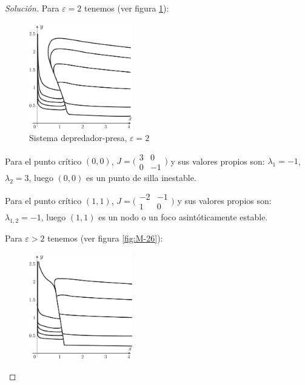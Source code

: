 \documentclass[a5paper,doc,10pt,noapacite]{apa6}
\begin{document}
{{\begin{proof}[Solución]
	\newpage
	Para \(\varepsilon=2\) tenemos (ver figura \ref{fig:M-25}):
	
	\begin{figure}[H]
		\captionsetup{justification=centering, labelfont=footnotesize, font=footnotesize}
		\centering
		\includegraphics[width=4.5cm]{Graficos/figura25}
	
		\caption{Sistema depredador-presa, \(\varepsilon=2\)}
		\label{fig:M-25}
	\end{figure}
	
	\begin{APAenumerate}
	\item Para el punto crítico \((0,0)\), \(J= \Big(\begin{smallmatrix}  3 & 0 \\ 0 & -1 \end{smallmatrix} \Big) \) y sus valores propios son: \(\lambda_1=-1\), \(\lambda_2=3\), luego \((0,0)\)  es un punto de silla inestable.
	\item Para el punto crítico \((1,1)\), \(J= \Big(\begin{smallmatrix}  -2 & -1 \\ 1 & 0 \end{smallmatrix} \Big) \) y sus valores propios son: \(\lambda_{1,2}=-1\), luego \((1,1)\) es un nodo o un foco asintóticamente estable.
\end{APAenumerate}


	Para \(\varepsilon>2\) tenemos (ver figura \ref{fig:M-26}):
	
	\begin{figure}[H]
		\captionsetup{justification=centering, labelfont=footnotesize, font=footnotesize}
		\centering
		\includegraphics[width=4.5cm]{Graficos/figura26}
	

\end{figure}
\end{proof}}}
\end{document}
